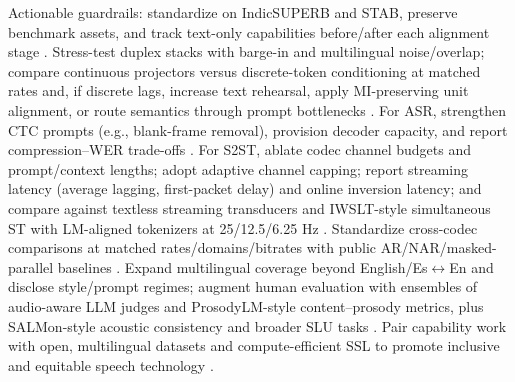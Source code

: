 \documentclass{article}
\begin{document}
Actionable guardrails: standardize on IndicSUPERB and STAB, preserve benchmark assets, and track text-only capabilities before/after each alignment stage \cite{vashishth2024stabspeechtokenizerassessmentbenchmark,entry2025indicsuperbspeechprocessinguniversalperf}. Stress-test duplex stacks with barge-in and multilingual noise/overlap; compare continuous projectors versus discrete-token conditioning at matched rates and, if discrete lags, increase text rehearsal, apply MI-preserving unit alignment, or route semantics through prompt bottlenecks \cite{ma2024languagemodelcanlistenwhilespeaking,wang2025bossbeyondsemanticspeech,tsunoo2024decoderonlyarchitecturespeechrecognition}. For ASR, strengthen CTC prompts (e.g., blank-frame removal), provision decoder capacity, and report compression--WER trade-offs \cite{tsunoo2024decoderonlyarchitecturespeechrecognition}. For S2ST, ablate codec channel budgets and prompt/context lengths; adopt adaptive channel capping; report streaming latency (average lagging, first-packet delay) and online inversion latency; and compare against textless streaming transducers and IWSLT-style simultaneous ST with LM-aligned tokenizers at 25/12.5/6.25 Hz \cite{peng2024mslms2stmultitaskspeechlanguagemodeltext,jo2025lmsptalignedsemanticdistillationspeechto,ouyang2025cmusiwslt2025simultaneousspeechtranslati,zhao2024textlessstreamingspeechtranslationsemant,sheng2025syncspeechlowlatencyefficientdualstreamt}. Standardize cross-codec comparisons at matched rates/domains/bitrates with public AR/NAR/masked-parallel baselines \cite{li2024investigatingneuralaudiocodecsspeechlang}. Expand multilingual coverage beyond English/Es$\leftrightarrow$En and disclose style/prompt regimes; augment human evaluation with ensembles of audio-aware LLM judges and ProsodyLM-style content--prosody metrics, plus SALMon-style acoustic consistency and broader SLU tasks \cite{qian2025prosodylmuncoveringemergingprosodyproces,chiang2025audioawarelargelanguagemodelsasjudgesspe,maimon2025salmonsuiteacousticlanguagemodelevaluati,entry2025indicsuperbspeechprocessinguniversalperf}. Pair capability work with open, multilingual datasets and compute-efficient SSL to promote inclusive and equitable speech technology \cite{chen2023reducingbarriersselfsupervisedlearninghu,entry2025indicsuperbspeechprocessinguniversalperf,wang2025bossbeyondsemanticspeech,yang2024buildingtaiwanesemandarinspokenlanguagem,fily2024establishingdegreesclosenessbetweenaudio}.
\end{document}
